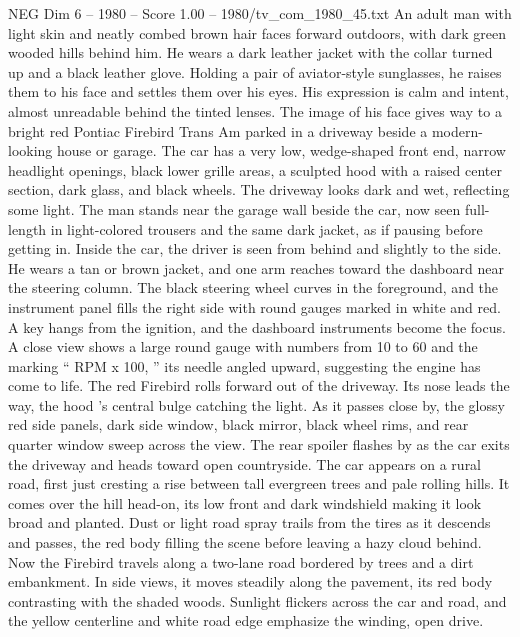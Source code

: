 \begin{textsample}{NEG Dim 6 – 1980 – Score 1.00 – 1980/tv\_com\_1980\_45.txt}  \label{ex:f6_neg_068}
An adult man with light skin and neatly combed brown hair faces forward outdoors, with dark green wooded hills behind him.
He wears a dark leather jacket with the collar turned up and a black leather glove.
Holding a pair of aviator-style sunglasses, he raises them to his face and settles them over his eyes.
His expression is calm and intent, almost unreadable behind the tinted lenses.
The image of his face gives way to a bright red Pontiac Firebird Trans Am parked in a driveway beside a modern-looking house or garage.
The car has a very low, wedge-shaped front end, narrow headlight openings, black lower grille areas, a sculpted hood with a raised center section, dark glass, and black wheels.
The driveway looks dark and wet, reflecting some light.
The man stands near the garage wall beside the car, now seen full-length in light-colored trousers and the same dark jacket, as if pausing before getting in.
Inside the car, the driver is seen from behind and slightly to the side.
He wears a tan or brown jacket, and one arm reaches toward the dashboard near the steering column.
The black steering wheel curves in the foreground, and the instrument panel fills the right side with round gauges marked in white and red.
A key hangs from the ignition, and the dashboard instruments become the focus.
A close view shows a large round gauge with numbers from 10 to 60 and the marking “ RPM x 100, ” its needle angled upward, suggesting the engine has come to life.
The red Firebird rolls forward out of the driveway.
Its nose leads the way, the hood ’s central bulge catching the light.
As it passes close by, the glossy red side panels, dark side window, black mirror, black wheel rims, and rear quarter window sweep across the view.
The rear spoiler flashes by as the car exits the driveway and heads toward open countryside.
The car appears on a rural road, first just cresting a rise between tall evergreen trees and pale rolling hills.
It comes over the hill head-on, its low front and dark windshield making it look broad and planted.
Dust or light road spray trails from the tires as it descends and passes, the red body filling the scene before leaving a hazy cloud behind.
Now the Firebird travels along a two-lane road bordered by trees and a dirt embankment.
In side views, it moves steadily along the pavement, its red body contrasting with the shaded woods.
Sunlight flickers across the car and road, and the yellow centerline and white road edge emphasize the winding, open drive.

\end{textsample}
